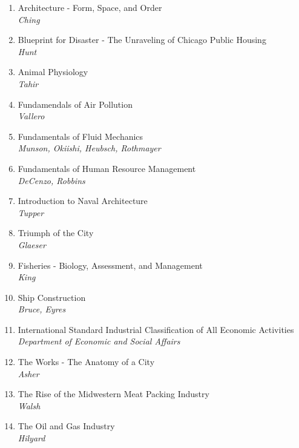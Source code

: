 \documentclass[oneside, titlepage]{article}
\begin{document}
\begin{enumerate}
\item{Architecture - Form, Space, and Order\\ \itshape Ching}

\item{Blueprint for Disaster - The Unraveling of Chicago Public Housing\\ \itshape Hunt}

\item{Animal Physiology\\ \itshape Tahir}

\item{Fundamendals of Air Pollution\\ \itshape Vallero}

\item{Fundamentals of Fluid Mechanics\\ \itshape Munson, Okiishi, Heubsch, Rothmayer}

\item{Fundamentals of Human Resource Management\\ \itshape DeCenzo, Robbins}

\item{Introduction to Naval Architecture\\ \itshape Tupper}

\item{Triumph of the City\\ \itshape Glaeser}

\item{Fisheries - Biology, Assessment, and Management\\ \itshape King}

\item{Ship Construction\\ \itshape Bruce, Eyres}

\item{International Standard Industrial Classification of All Economic Activities\\ \itshape Department of Economic and Social Affairs}

\item{The Works - The Anatomy of a City\\ \itshape Asher}

\item{The Rise of the Midwestern Meat Packing Industry\\  \itshape Walsh}

\item{The Oil and Gas Industry\\ \itshape Hilyard}


\end{enumerate}
\end{document}
